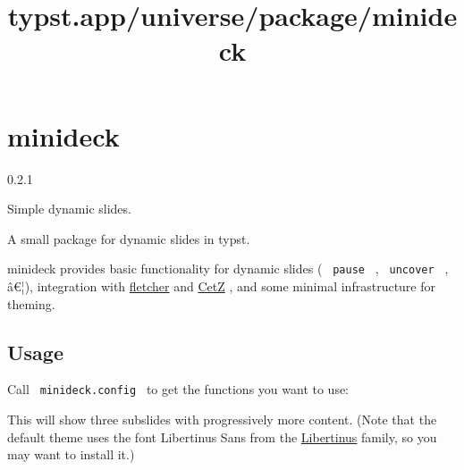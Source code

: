 \title{typst.app/universe/package/minideck}

\label{banner}
\section{minideck}\label{minideck}

{ 0.2.1 }

Simple dynamic slides.

\label{readme}
A small package for dynamic slides in typst.

minideck provides basic functionality for dynamic slides (
\texttt{\ pause\ } , \texttt{\ uncover\ } , â€¦), integration with
\href{https://typst.app/universe/package/fletcher}{fletcher} and
\href{https://typst.app/universe/package/cetz/}{CetZ} , and some minimal
infrastructure for theming.

\subsection{Usage}\label{usage}

Call \texttt{\ minideck.config\ } to get the functions you want to use:

\begin{Shaded}
\begin{Highlighting}[]


\NormalTok{\#title{-}slide[}

\NormalTok{]}

\NormalTok{\#slide[}




\NormalTok{]}
\end{Highlighting}
\end{Shaded}

This will show three subslides with progressively more content. (Note
that the default theme uses the font Libertinus Sans from the
\href{https://github.com/alerque/libertinus}{Libertinus} family, so you
may want to install it.)

